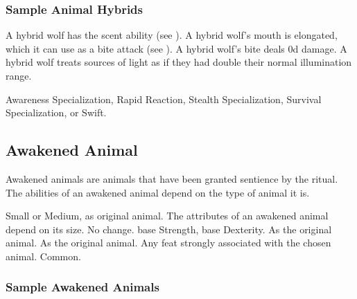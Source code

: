         \subsubsection{Sample Animal Hybrids}


            \begin{itemize}
                 A hybrid wolf has the scent ability (see ).
                 A hybrid wolf's mouth is elongated, which it can use as a bite attack (see ).
                    A hybrid wolf's bite deals \plus0d damage.
                 A hybrid wolf treats sources of light as if they had double their normal illumination range.
            \end{itemize}
         Awareness Specialization, Rapid Reaction, Stealth Specialization, Survival Specialization, or Swift.

    \subsection{Awakened Animal}

        Awakened animals are animals that have been granted sentience by the  ritual.
        The abilities of an awakened animal depend on the type of animal it is.

         Small or Medium, as original animal.
         The attributes of an awakened animal depend on its size.
         No change.
          base Strength,  base Dexterity.
         As the original animal.
         As the original animal.
         Any feat strongly associated with the chosen animal.
         Common.

        \subsubsection{Sample Awakened Animals}


